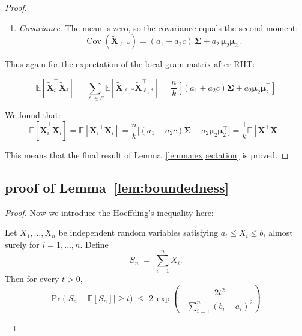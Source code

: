 \documentclass[11pt]{article}
\numberwithin{equation}{section}
\theoremstyle{plain}
\theoremstyle{definition}
\theoremstyle{remark}
\begin{document}
\begin{appendix}
\begin{proof}
\begin{enumerate}
         \item \textit{Covariance}.
             The mean is zero, so the covariance equals the second moment:
             \[
             \operatorname{Cov}(\mathbf{\tilde{X}}_{\ell,\ast})
           = (a_{1}+a_{2}c)\,\mathbf{\Sigma}
           + a_{2}\,\boldsymbol{\mu}_{2}\boldsymbol{\mu}_{2}^{\top}.
             \]
         \end{enumerate}

         Thus again for the expectation of the local gram matrix after RHT:

         \begin{equation*}
         \mathbb{E}[\mathbf{\tilde{X}}_i^{\top}\mathbf{\tilde{X}}_i]
           = \sum_{\ell \in S} \mathbb{E}[\mathbf{\tilde{X}}_{\ell,\ast}\mathbf{\tilde{X}}_{\ell,\ast}^{\top}]
           = \frac{n}{k}\left[(a_{1}+a_{2}c)\mathbf{\Sigma} + a_{2}\boldsymbol{\mu}_{2}\boldsymbol{\mu}_{2}^{\top}\right]
         \end{equation*}

         We found that:
         \small
         \[
         \mathbb{E}[\mathbf{\tilde{X}}_i^{\top}\mathbf{\tilde{X}}_i]
           =\mathbb{E}[{\mathbf{X}_i}^{\top}{\mathbf{X}_i}]
           =\frac{n}{k}\bigl[(a_{1}+a_{2}c)\mathbf{\Sigma}+a_{2}\boldsymbol{\mu}_{2}\boldsymbol{\mu}_{2}^{\top}\bigr]
           = \frac{1}{k} \mathbb{E}[\mathbf{X}^{\top} \mathbf{X}]
         \]
         \normalsize

         This means that the final result of Lemma~\ref{lemma:expectation} is proved.

      \end{proof}




      \subsection{proof of Lemma~\ref{lem:boundedness}}

\begin{proof}
Now we introduce the Hoeffding's inequality here:

\begin{thm}
    Let \(X_1,\dots,X_n\) be independent random variables satisfying
    \(a_i \le X_i \le b_i\) almost surely for \(i=1,\dots,n\).
    Define
    \[
    S_n \;=\; \sum_{i=1}^{n} X_i .
    \]
    Then for every \(t>0\),
    \[
    \Pr\!\bigl(|S_n - \mathbb{E}[S_n]| \ge t\bigr)
       \;\le\;
       2\,\exp\!\left(
            -\frac{2t^{2}}{\displaystyle\sum_{i=1}^{n}(b_i-a_i)^{2}}
       \right).
    \]
    \end{thm}


\end{proof}
\end{appendix}
\end{document}
